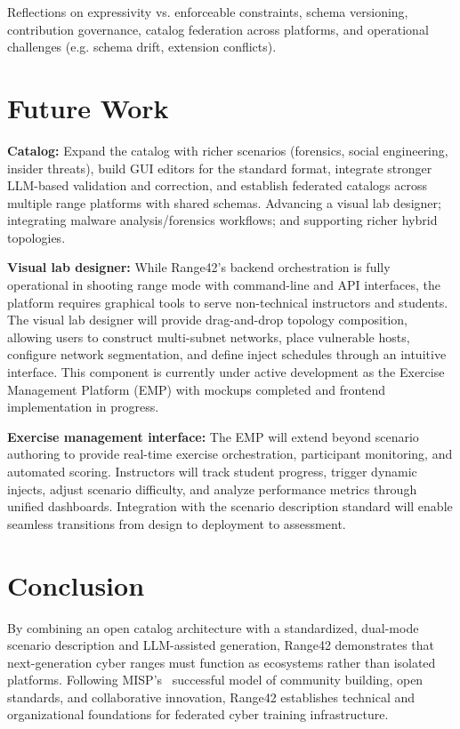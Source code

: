 \documentclass[11pt]{article}
\begin{document}
Reflections on expressivity vs. enforceable constraints, schema versioning, contribution governance, catalog federation across platforms, and operational challenges (e.g. schema drift, extension conflicts).

\section{Future Work}

\textbf{Catalog:} Expand the catalog with richer scenarios (forensics, social engineering, insider threats), build GUI editors for the standard format, integrate stronger LLM-based validation and correction, and establish federated catalogs across multiple range platforms with shared schemas. Advancing a visual lab designer; integrating malware analysis/forensics workflows; and supporting richer hybrid topologies.

\textbf{Visual lab designer:} While Range42's backend orchestration is fully operational in shooting range mode with command-line and API interfaces,
the platform requires graphical tools to serve non-technical instructors and students.
The visual lab designer will provide drag-and-drop topology composition, allowing users to construct multi-subnet networks, place vulnerable hosts, configure network segmentation, and define inject schedules through an intuitive interface.
This component is currently under active development as the Exercise Management Platform (EMP) with mockups completed and frontend implementation in progress.

\textbf{Exercise management interface:} The EMP will extend beyond scenario authoring to provide real-time exercise orchestration, participant monitoring, and automated scoring.
Instructors will track student progress, trigger dynamic injects, adjust scenario difficulty, and analyze performance metrics through unified dashboards.
Integration with the scenario description standard will enable seamless transitions from design to deployment to assessment.

\section{Conclusion}

By combining an open catalog architecture with a standardized, dual-mode scenario description and LLM-assisted generation, Range42 demonstrates that next-generation cyber ranges must function as ecosystems rather than isolated platforms. Following MISP's~\cite{misp} successful model of community building, open standards, and collaborative innovation, Range42 establishes technical and organizational foundations for federated cyber training infrastructure.
\end{document}
